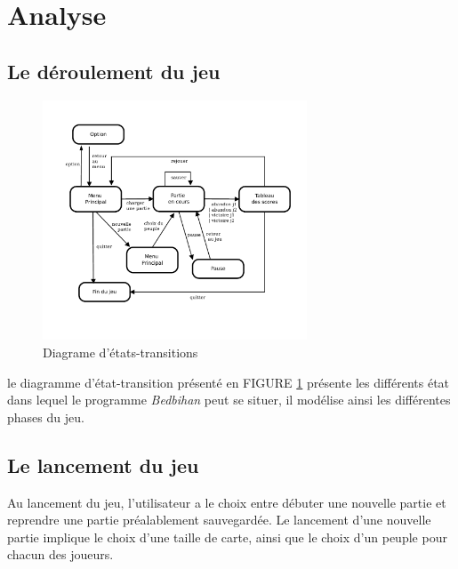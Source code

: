
\section{Analyse}

	
	\subsection{Le déroulement du jeu}


		\begin{figure}[h]
			\begin{center}
				\includegraphics[width=0.7\textwidth]{figure/etat_transition_partie.pdf}
			\end{center}
			\caption{Diagrame d'états-transitions}
			\label{fig:transition_jeu}
		\end{figure}
	
		le diagramme d'état-transition présenté en FIGURE \ref{fig:transition_jeu} présente les différents état dans lequel le programme \emph{Bedbihan} peut se situer, il modélise ainsi les différentes phases du jeu.


		\subsection{Le lancement du jeu}

		Au lancement du jeu, l'utilisateur a le choix entre débuter une nouvelle partie et reprendre une partie préalablement sauvegardée. Le lancement d'une nouvelle partie implique le choix d'une taille de carte, ainsi que le choix d'un peuple pour chacun des joueurs. 

